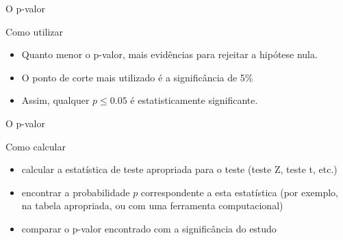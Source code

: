 \documentclass{beamer}
\begin{document}
\begin{frame}{O p-valor}
  \begin{block}{Como utilizar}
    \begin{itemize}
    \item Quanto menor o p-valor, mais evidências para rejeitar a
      hipótese nula.
    \item O ponto de corte mais utilizado é a significância de 5\%
    \item Assim, qualquer $p \le 0.05$ é estatisticamente significante.
    \end{itemize}
  \end{block}
\end{frame}

\begin{frame}{O p-valor}
  \begin{block}{Como calcular}
    \begin{itemize}
    \item calcular a estatística de teste apropriada para o teste
      (teste Z, teste t, etc.)
    \item encontrar a probabilidade $p$ correspondente a esta
      estatística (por exemplo, na tabela apropriada, ou com uma
      ferramenta computacional)
    \item comparar o p-valor encontrado com a significância do estudo
    \end{itemize}
  \end{block}
\end{frame}
\end{document}
